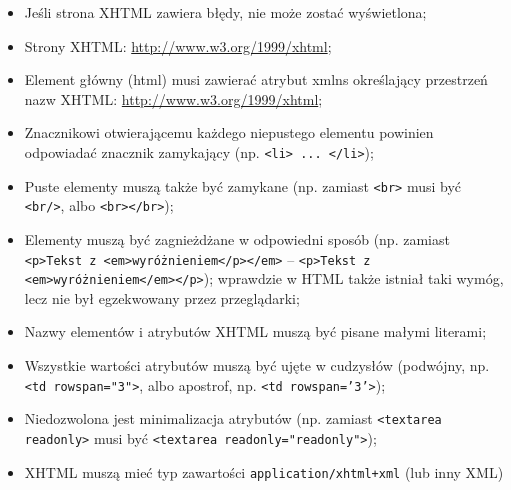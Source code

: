 \begin{itemize}
\item Jeśli strona XHTML zawiera błędy, nie może zostać wyświetlona;
\item Strony XHTML: \url{http://www.w3.org/1999/xhtml};
\item Element główny (html) musi zawierać atrybut xmlns określający przestrzeń nazw XHTML: \url{http://www.w3.org/1999/xhtml};
\item Znacznikowi otwierającemu każdego niepustego elementu powinien odpowiadać znacznik zamykający (np. \texttt{<li> ... </li>});
\item Puste elementy muszą także być zamykane (np. zamiast \texttt{<br>} musi być \texttt{<br/>}, albo \texttt{<br></br>});
\item Elementy muszą być zagnieżdżane w odpowiedni sposób (np. zamiast \texttt{<p>Tekst z <em>wyróżnieniem</p></em>} -- \texttt{<p>Tekst z <em>wyróżnieniem</em></p>}); wprawdzie w HTML także istniał taki wymóg, lecz nie był egzekwowany przez przeglądarki;
\item Nazwy elementów i atrybutów XHTML muszą być pisane małymi literami;
\item Wszystkie wartości atrybutów muszą być ujęte w cudzysłów (podwójny, np. \texttt{<td rowspan="3">}, albo apostrof, np. \texttt{<td rowspan='3'>});
\item Niedozwolona jest minimalizacja atrybutów (np. zamiast \texttt{<textarea readonly>} musi być \texttt{<textarea readonly="readonly">});
\item XHTML muszą mieć typ zawartości \texttt{application/xhtml+xml} (lub inny XML)
\end{itemize}
